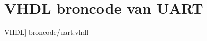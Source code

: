 \section[UART]{VHDL broncode van UART}\label{appdix:uart} 
	\scriptsize
	 VHDL] {broncode/uart.vhdl}
	\normalsize


